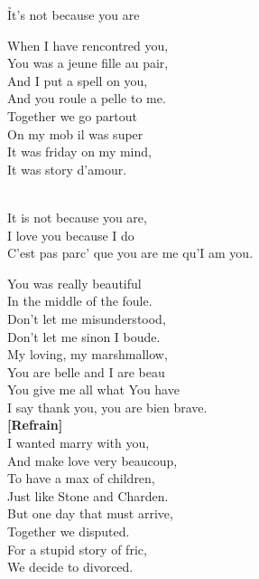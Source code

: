 \documentclass{novel}
\begin{document}
\newpage
\large

\h*{It’s not because you are}

\begin{multicols}{2}
When I have rencontred you,\\
You was a jeune fille au pair,\\
And I put a spell on you,\\
And you roule a pelle to me.\\

Together we go partout\\
On my mob il was super\\
It was friday on my mind,\\
It was story d'amour.\\

\begin{bfseries}
[Refrain:]\\
It is not because you are,\\
I love you because I do\\
C'est pas parc' que you are me qu'I am you.\\
\end{bfseries}

You was really beautiful\\
In the middle of the foule.\\
Don't let me misunderstood,\\
Don't let me sinon I boude.\\

My loving, my marshmallow,\\
You are belle and I are beau\\
You give me all what You have\\
I say thank you, you are bien brave.\\

\textbf{[Refrain]}\\

I wanted marry with you,\\
And make love very beaucoup,\\
To have a max of children,\\
Just like Stone and Charden.\\

But one day that must arrive,\\
Together we disputed.\\
For a stupid story of fric,\\
We decide to divorced.\\


\end{multicols}
\end{document}
